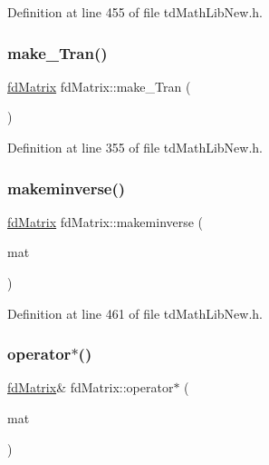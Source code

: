 Definition at line 455 of file td\+Math\+Lib\+New.\+h.

\hypertarget{classfd_matrix_a8da66a008b9eb84778017cd35232d17f}{}\label{classfd_matrix_a8da66a008b9eb84778017cd35232d17f} 
\subsubsection{\texorpdfstring{make\+\_\+\+Tran()}{make\_Tran()}}
{\footnotesize\ttfamily \hyperlink{classfd_matrix}{fd\+Matrix} fd\+Matrix\+::make\+\_\+\+Tran (\begin{DoxyParamCaption}{ }\end{DoxyParamCaption})\hspace{0.3cm}{\ttfamily [inline]}}



Definition at line 355 of file td\+Math\+Lib\+New.\+h.

\hypertarget{classfd_matrix_a833472cadd1c6a9caac01741ad5ab9f6}{}\label{classfd_matrix_a833472cadd1c6a9caac01741ad5ab9f6} 
\subsubsection{\texorpdfstring{makeminverse()}{makeminverse()}}
{\footnotesize\ttfamily \hyperlink{classfd_matrix}{fd\+Matrix} fd\+Matrix\+::makeminverse (\begin{DoxyParamCaption}\item[{\hyperlink{classfd_matrix}{fd\+Matrix}}]{mat }\end{DoxyParamCaption})\hspace{0.3cm}{\ttfamily [inline]}}



Definition at line 461 of file td\+Math\+Lib\+New.\+h.

\hypertarget{classfd_matrix_a5452efb88f91f98a5cd80ce8e394c3f6}{}\label{classfd_matrix_a5452efb88f91f98a5cd80ce8e394c3f6} 
\subsubsection{\texorpdfstring{operator$\ast$()}{operator*()}}
{\footnotesize\ttfamily \hyperlink{classfd_matrix}{fd\+Matrix}\& fd\+Matrix\+::operator$\ast$ (\begin{DoxyParamCaption}\item[{\hyperlink{classfd_matrix}{fd\+Matrix} \&}]{mat }\end{DoxyParamCaption})\hspace{0.3cm}{\ttfamily [inline]}}



